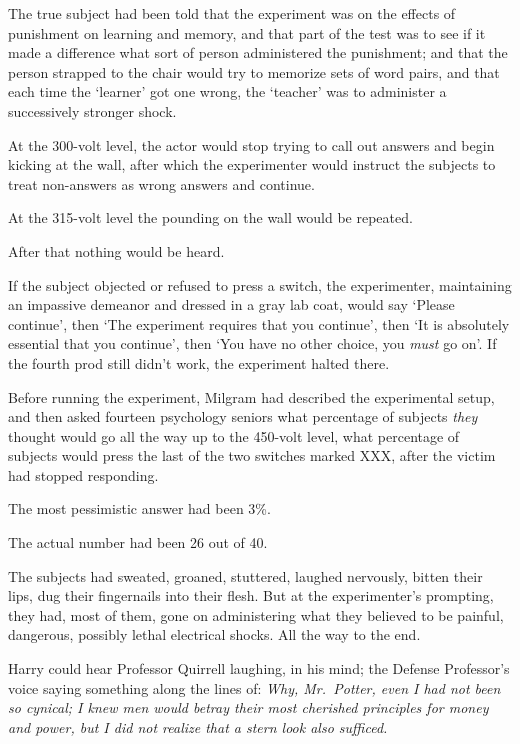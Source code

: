 The true subject had been told that the experiment was on the effects of punishment on learning and memory, and that part of the test was to see if it made a difference what sort of person administered the punishment; and that the person strapped to the chair would try to memorize sets of word pairs, and that each time the ‘learner’ got one wrong, the ‘teacher’ was to administer a successively stronger shock.

At the 300-volt level, the actor would stop trying to call out answers and begin kicking at the wall, after which the experimenter would instruct the subjects to treat non-answers as wrong answers and continue.

At the 315-volt level the pounding on the wall would be repeated.

After that nothing would be heard.

If the subject objected or refused to press a switch, the experimenter, maintaining an impassive demeanor and dressed in a gray lab coat, would say ‘Please continue’, then ‘The experiment requires that you continue’, then ‘It is absolutely essential that you continue’, then ‘You have no other choice, you \emph{must} go on’. If the fourth prod still didn’t work, the experiment halted there.

Before running the experiment, Milgram had described the experimental setup, and then asked fourteen psychology seniors what percentage of subjects \emph{they} thought would go all the way up to the 450-volt level, what percentage of subjects would press the last of the two switches marked XXX, after the victim had stopped responding.

The most pessimistic answer had been 3\%.

The actual number had been 26 out of 40.

The subjects had sweated, groaned, stuttered, laughed nervously, bitten their lips, dug their fingernails into their flesh. But at the experimenter’s prompting, they had, most of them, gone on administering what they believed to be painful, dangerous, possibly lethal electrical shocks. All the way to the end.

Harry could hear Professor Quirrell laughing, in his mind; the Defense Professor’s voice saying something along the lines of: \emph{Why, Mr.~Potter, even I had not been so cynical; I knew men would betray their most cherished principles for money and power, but I did not realize that a stern look also sufficed.}


